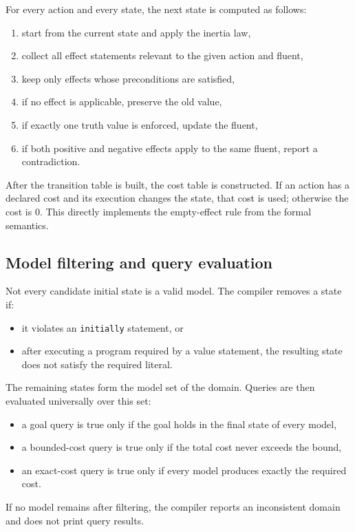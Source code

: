 \documentclass[11pt]{article}
\begin{document}
For every action and every state, the next state is computed as follows:
\begin{enumerate}
    \item start from the current state and apply the inertia law,
    \item collect all effect statements relevant to the given action and fluent,
    \item keep only effects whose preconditions are satisfied,
    \item if no effect is applicable, preserve the old value,
    \item if exactly one truth value is enforced, update the fluent,
    \item if both positive and negative effects apply to the same fluent,
    report a contradiction.
\end{enumerate}

After the transition table is built, the cost table is constructed.
If an action has a declared cost and its execution changes the state, that
cost is used; otherwise the cost is \(0\). This directly implements the
empty-effect rule from the formal semantics.

\subsection{Model filtering and query evaluation}
Not every candidate initial state is a valid model. The compiler removes a state if:
\begin{itemize}
    \item it violates an \texttt{initially} statement, or
    \item after executing a program required by a value statement, the resulting
    state does not satisfy the required literal.
\end{itemize}

The remaining states form the model set of the domain.
Queries are then evaluated universally over this set:
\begin{itemize}
    \item a goal query is true only if the goal holds in the final state of every model,
    \item a bounded-cost query is true only if the total cost never exceeds the bound,
    \item an exact-cost query is true only if every model produces exactly the required cost.
\end{itemize}

If no model remains after filtering, the compiler reports an inconsistent domain
and does not print query results.
\end{document}
